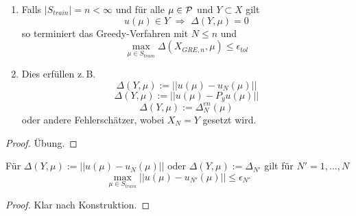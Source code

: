 \begin{lemma} \beginwithlist
\begin{enumerate}
	\item Falls  $|S_{train}| = n < \infty$ und für alle $\mu \in \mathcal{P}$ und $Y \subset X$ gilt
	\[
		u(\mu) \in Y \,\, \Rightarrow \,\, \Delta(Y,\mu) = 0
	\]
	so terminiert das Greedy-Verfahren mit $N \leq n$ und
	\[
		\max\limits_{\mu \in S_{train}} \Delta(X_{GRE, n} , \mu) \leq \epsilon_{tol}
	\]
	\item Dies erfüllen z.\,B.
	\[
		\Delta(Y,\mu) := ||u(\mu) - u_N(\mu)||
	\]
	\[
		\Delta(Y,\mu) := ||u(\mu) - P_y u(\mu)||
	\]
	\[
		\Delta(Y,\mu) := \Delta_N^{en} (\mu)
	\]
	oder andere Fehlerschätzer, wobei $X_N = Y$ gesetzt wird.
\end{enumerate}
\begin{proof}
	Übung.
\end{proof}
\end{lemma}

\begin{kor}[Fehleraussage]
	Für $\Delta(Y,\mu) := ||u(\mu) - u_N(\mu)||$ oder $\Delta(Y,\mu) := \Delta_{N'}$ gilt für $N' = 1,\dots,N$
	\[
		\max\limits_{\mu \in S_{train}} ||u(\mu) - u_{N'}(\mu)|| \leq \epsilon_{N'}
	\]
	\begin{proof}
		Klar nach Konstruktion.
	\end{proof}
\end{kor}

